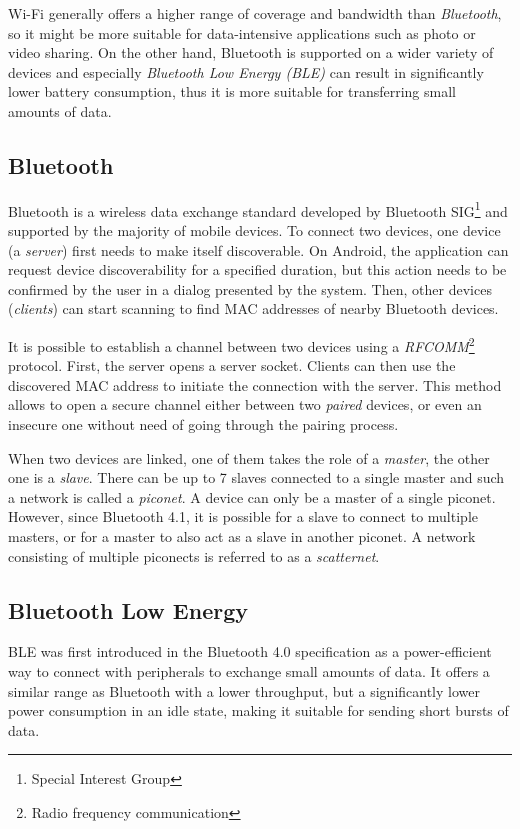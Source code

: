 \documentclass[conference,compsoc]{IEEEtran}
\begin{document}
Wi-Fi generally offers a higher range of coverage and bandwidth than \textit{Bluetooth}, so it might be more suitable for data-intensive applications such as photo or video sharing. On the other hand, Bluetooth is supported on a wider variety of devices and especially \textit{Bluetooth Low Energy (BLE)} \cite{android:ble} can result in significantly lower battery consumption, thus it is more suitable for transferring small amounts of data.

\subsection{Bluetooth}
Bluetooth is a wireless data exchange standard developed by Bluetooth SIG\footnote{Special Interest Group} and supported by the majority of mobile devices. To connect two devices, one device
 (a \textit{server}) first needs to make itself discoverable. On Android, the application can request device discoverability for a specified duration, but this action needs to be confirmed by the user in a dialog presented by the system. Then, other devices (\textit{clients}) can start scanning to find MAC addresses of nearby Bluetooth devices.

It is possible to establish a channel between two devices using a \textit{RFCOMM}\footnote{Radio frequency communication} protocol. First, the server opens a server socket. Clients can then use the discovered MAC address to initiate the connection with the server. This method allows to open a secure channel either between two \textit{paired} devices, or even an insecure one without need of going through the pairing process.

When two devices are linked, one of them takes the role of a \textit{master}, the other one is a \textit{slave}. There can be up to 7 slaves connected to a single master and such a network is called a \textit{piconet}. A device can only be a master of a single piconet. However, since Bluetooth 4.1, it is possible for a slave to connect to multiple masters, or for a master to also act as a slave in another piconet. A network consisting of multiple piconects is referred to as a \textit{scatternet}. \cite{bluetooth51spec}

\subsection{Bluetooth Low Energy}
BLE was first introduced in the Bluetooth 4.0 specification as a power-efficient way to connect with peripherals to exchange small amounts of data. It offers a similar range as Bluetooth with a lower throughput, but a significantly lower power consumption in an idle state, making it suitable for sending short bursts of data.
\end{document}

